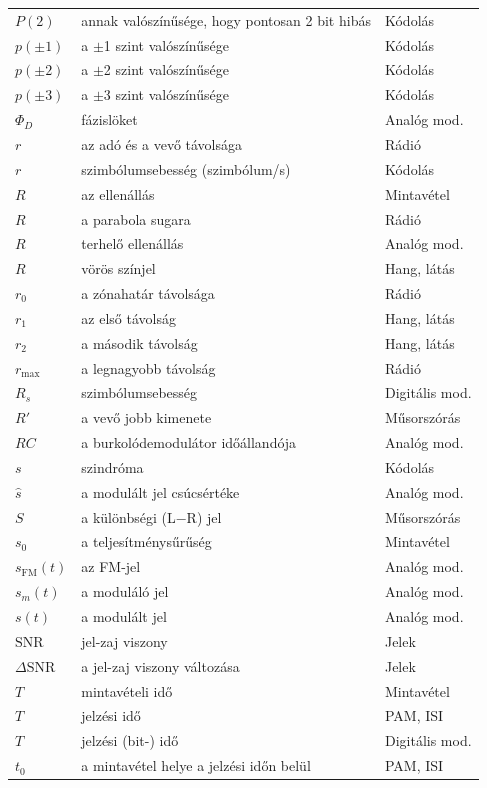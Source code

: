 {\begin{longtable}{@{}>{\raggedright\arraybackslash}p{2.4cm}>{\raggedright\arraybackslash}p{8.2cm}>{\raggedright\arraybackslash}p{3.8cm}@{}}
$P(2)$ & annak valószínűsége, hogy pontosan 2 bit hibás & Kódolás\\
$p(\pm1)$ & a $\pm$1 szint valószínűsége & Kódolás\\
$p(\pm2)$ & a $\pm$2 szint valószínűsége & Kódolás\\
$p(\pm3)$ & a $\pm$3 szint valószínűsége & Kódolás\\
$\Phi_D$ & fázislöket & Analóg mod.\\
$r$ & az adó és a vevő távolsága & Rádió\\
$r$ & szimbólumsebesség (szimbólum/s) & Kódolás\\
$R$ & az ellenállás & Mintavétel\\
$R$ & a parabola sugara & Rádió\\
$R$ & terhelő ellenállás & Analóg mod.\\
$R$ & vörös színjel & Hang, látás\\
$r_0$ & a zónahatár távolsága & Rádió\\
$r_1$ & az első távolság & Hang, látás\\
$r_2$ & a második távolság & Hang, látás\\
$r_{\max}$ & a legnagyobb távolság & Rádió\\
$R_s$ & szimbólumsebesség & Digitális mod.\\
$R'$ & a vevő jobb kimenete & Műsorszórás\\
$RC$ & a burkolódemodulátor időállandója & Analóg mod.\\
$s$ & szindróma & Kódolás\\
$\hat s$ & a modulált jel csúcsértéke & Analóg mod.\\
$S$ & a különbségi (L$-$R) jel & Műsorszórás\\
$s_0$ & a teljesítménysűrűség & Mintavétel\\
$s_\mathrm{FM}(t)$ & az FM-jel & Analóg mod.\\
$s_m(t)$ & a moduláló jel & Analóg mod.\\
$s(t)$ & a modulált jel & Analóg mod.\\
$\text{SNR}$ & jel-zaj viszony & Jelek\\
$\Delta\text{SNR}$ & a jel-zaj viszony változása & Jelek\\
$T$ & mintavételi idő & Mintavétel\\
$T$ & jelzési idő & PAM, ISI\\
$T$ & jelzési (bit-) idő & Digitális mod.\\
$t_0$ & a mintavétel helye a jelzési időn belül & PAM, ISI\\

\end{longtable}}
